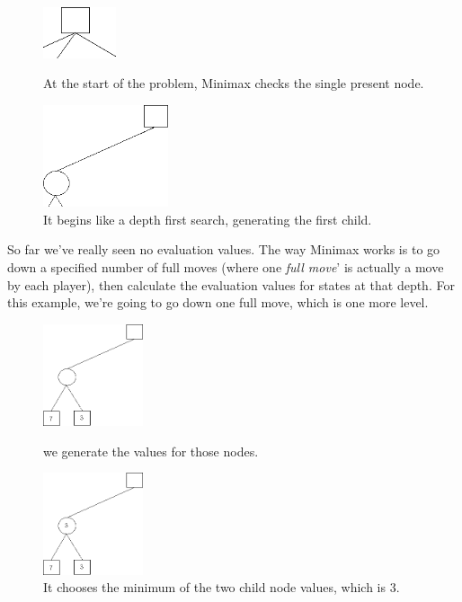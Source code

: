 \begin{figure}[H]
\centering
	\begin{minipage}[b]{0.45\linewidth}
		\centering
		\includegraphics[height=1.5cm]{2_State_of_the_art/Arimaa_on_MCTS_Benoit/img/Minimax2.png}
		\caption{\label{fig:Minimax2}At the start of the problem, Minimax checks the single present node.}
	\end{minipage}%
	\hspace*{1cm}
	\begin{minipage}[b]{0.45\linewidth}
		\centering
		\includegraphics[height=3cm]{2_State_of_the_art/Arimaa_on_MCTS_Benoit/img/Minimax3.png}
		\caption{\label{fig:Minimax3}It begins like a depth first search, generating the first child.}
	\end{minipage}%
\end{figure}

So far we've really seen no evaluation values. The way Minimax works is to go down a specified number of full moves (where one \emph{full move}' is actually a move by each player), then calculate the evaluation values for states at that depth. For this example, we're going to go down one full move, which is one more level.
\begin{figure}[H]
\centering
	\begin{minipage}[b]{0.45\linewidth}
		\centering
		\includegraphics[height=3cm]{2_State_of_the_art/Arimaa_on_MCTS_Benoit/img/Minimax4.png}
		\caption{\label{fig:Minimax4}we generate the values for those nodes.}
	\end{minipage}%
	\hspace*{1cm}
	\begin{minipage}[b]{0.45\linewidth}
		\centering
		\includegraphics[height=3cm]{2_State_of_the_art/Arimaa_on_MCTS_Benoit/img/Minimax5.png}
		\caption{\label{fig:Minimax5}It chooses the minimum of the two child node values, which is 3.}
	\end{minipage}%
\end{figure}

